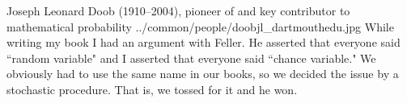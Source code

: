   \qboxnpq
    {Joseph Leonard Doob (1910--2004), pioneer of and key contributor to mathematical probability\footnotemark}
    {../common/people/doobjl_dartmouthedu.jpg}
    {While writing my book I had an argument with Feller. 
     He asserted that everyone said ``random variable" and I asserted that everyone said ``chance variable." 
     We obviously had to use the same name in our books, so we decided the issue by a stochastic procedure. 
     That is, we tossed for it and he won.}

